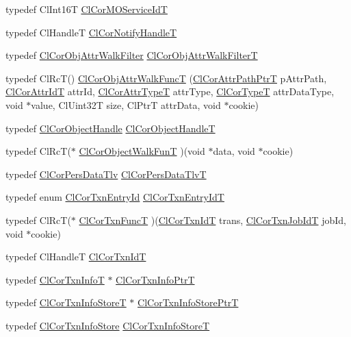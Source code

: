 \begin{CompactItemize}
\item 
typedef Cl\-Int16T \hyperlink{group__group13_ga27}{Cl\-Cor\-MOService\-Id\-T}
\item 
typedef Cl\-Handle\-T \hyperlink{group__group13_ga59}{Cl\-Cor\-Notify\-Handle\-T}
\item 
typedef \hyperlink{struct_cl_cor_obj_attr_walk_filter}{Cl\-Cor\-Obj\-Attr\-Walk\-Filter} \hyperlink{group__group13_ga34}{Cl\-Cor\-Obj\-Attr\-Walk\-Filter\-T}
\item 
typedef Cl\-Rc\-T() \hyperlink{group__group13_ga35}{Cl\-Cor\-Obj\-Attr\-Walk\-Func\-T} (\hyperlink{struct_cl_cor_attr_path}{Cl\-Cor\-Attr\-Path\-Ptr\-T} p\-Attr\-Path, \hyperlink{group__group13_ga3}{Cl\-Cor\-Attr\-Id\-T} attr\-Id, \hyperlink{group__group13_ga10}{Cl\-Cor\-Attr\-Type\-T} attr\-Type, \hyperlink{group__group13_ga9}{Cl\-Cor\-Type\-T} attr\-Data\-Type, void $\ast$value, Cl\-Uint32T size, Cl\-Ptr\-T attr\-Data, void $\ast$cookie)
\item 
typedef \hyperlink{struct_cl_cor_object_handle}{Cl\-Cor\-Object\-Handle} \hyperlink{group__group13_ga15}{Cl\-Cor\-Object\-Handle\-T}
\item 
typedef Cl\-Rc\-T($\ast$ \hyperlink{group__group13_ga53}{Cl\-Cor\-Object\-Walk\-Fun\-T} )(void $\ast$data, void $\ast$cookie)
\item 
typedef \hyperlink{struct_cl_cor_pers_data_tlv}{Cl\-Cor\-Pers\-Data\-Tlv} \hyperlink{group__group13_ga62}{Cl\-Cor\-Pers\-Data\-Tlv\-T}
\item 
typedef enum \hyperlink{group__group13_ga338}{Cl\-Cor\-Txn\-Entry\-Id} \hyperlink{group__group13_ga42}{Cl\-Cor\-Txn\-Entry\-Id\-T}
\item 
typedef Cl\-Rc\-T($\ast$ \hyperlink{group__group13_ga60}{Cl\-Cor\-Txn\-Func\-T} )(\hyperlink{group__group13_ga17}{Cl\-Cor\-Txn\-Id\-T} trans, \hyperlink{group__group13_ga18}{Cl\-Cor\-Txn\-Job\-Id\-T} job\-Id, void $\ast$cookie)
\item 
typedef Cl\-Handle\-T \hyperlink{group__group13_ga17}{Cl\-Cor\-Txn\-Id\-T}
\item 
typedef \hyperlink{struct_cl_cor_txn_info}{Cl\-Cor\-Txn\-Info\-T} $\ast$ \hyperlink{group__group13_ga41}{Cl\-Cor\-Txn\-Info\-Ptr\-T}
\item 
typedef \hyperlink{struct_cl_cor_txn_info_store}{Cl\-Cor\-Txn\-Info\-Store\-T} $\ast$ \hyperlink{group__group13_ga44}{Cl\-Cor\-Txn\-Info\-Store\-Ptr\-T}
\item 
typedef \hyperlink{struct_cl_cor_txn_info_store}{Cl\-Cor\-Txn\-Info\-Store} \hyperlink{group__group13_ga43}{Cl\-Cor\-Txn\-Info\-Store\-T}

\end{CompactItemize}

